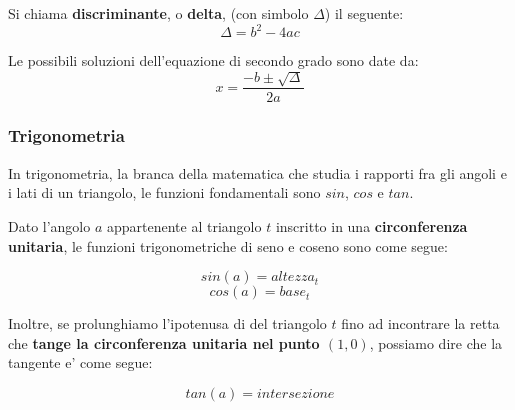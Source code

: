 \documentclass{article}
\begin{document}
{{    Si chiama \textbf{discriminante}, o \textbf{delta}, \small{(con simbolo $ \Delta $)} il seguente:
    $$ \Delta = b^2 - 4ac $$

    Le possibili soluzioni dell'equazione di secondo grado sono date da:
    $$ x = \frac{-b \pm \sqrt{\Delta}}{2a} $$

    \pagebreak

    \subsubsection{Trigonometria} %
    In trigonometria, la branca della matematica che studia i rapporti fra gli angoli e i lati di un triangolo, le funzioni fondamentali sono $ sin $, $ cos $ e $ tan $.

    Dato l'angolo $ a $ appartenente al triangolo $ t $ inscritto in una \textbf{circonferenza unitaria}, le funzioni trigonometriche di seno e coseno sono come segue:

    $$ sin(a) = altezza_t $$
    $$ cos(a) = base_t $$

    Inoltre, se prolunghiamo l'ipotenusa di del triangolo $ t $ fino ad incontrare la retta che \textbf{tange la circonferenza unitaria nel punto $ (1,0) $}, possiamo dire che la tangente e' come segue:


    $$ tan(a) = intersezione $$

    \usetikzlibrary{angles,quotes}
    \newcommand\Base[1][0]{
      \begin{scope}[xshift=#1]
        \clip
          (-0.5,5.5) rectangle (5.5,-0.5);
          \draw[->]
          (-0.5,0) -- (5,0) node[right] {$x$};
        \draw[->]
          (0,-0.5) -- (0,5) node[above] {$y$};
        \coordinate (O) at (0,0);
        \coordinate (aux1) at (40:4);
        \coordinate (aux2) at (aux1|-0,0);
        \coordinate (aux3) at (4,{4*tan(40)});
        \draw
          (O) -- (aux3) -- (aux3|-0,0)
          (aux1) -- (aux2);
        \draw[thick,red!70!black] 
          (O) circle (4);
        \pic[draw,"$a$",angle radius=30pt,angle eccentricity=1.2] {angle = aux2--O--aux1};   
      \end{scope}  
    }


}}
\end{document}
